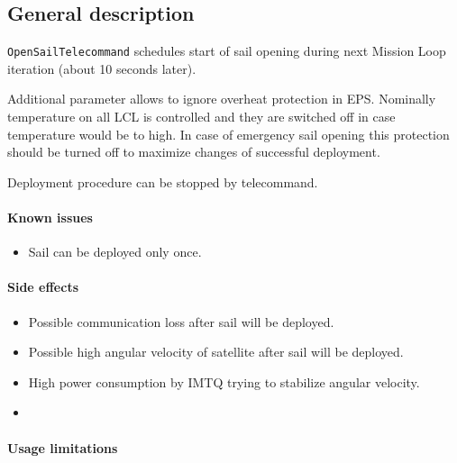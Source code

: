 

\subsection{General description}


\texttt{OpenSailTelecommand} schedules start of sail opening during next Mission Loop iteration (about 10 seconds later). 

Additional parameter allows to ignore overheat protection in EPS.
Nominally temperature on all LCL is controlled and they are switched off in case temperature would be to high. In case of emergency sail opening this protection should be turned off to maximize changes of successful deployment.

Deployment procedure can be stopped by  telecommand.



\paragraph{Known issues}
\begin{itemize}
	\item Sail can be deployed only once. 
\end{itemize}

\paragraph{Side effects}
\begin{itemize}
	\item Possible communication loss after sail will be deployed.
    \item Possible high angular velocity of satellite after sail will be deployed.
    \item High power consumption by IMTQ trying to stabilize angular velocity.
    \item {}
\end{itemize}

\paragraph{Usage limitations}\mbox{}\\ 
\None

